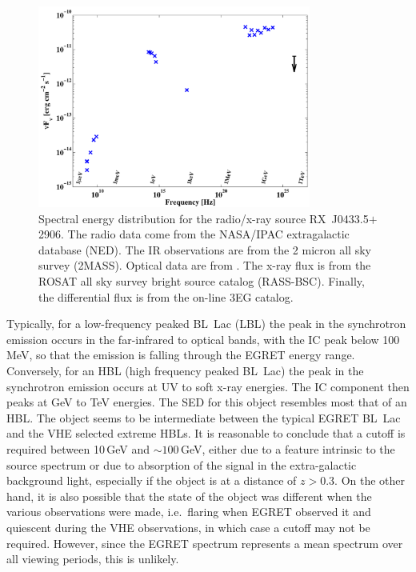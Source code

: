 \begin{figure}[p]
\centerline{\includegraphics[angle=270,width=0.8\textwidth]{plots/chap-observations/sed0433.pdf}}
\caption{\label{FIG::OBSERVATIONS::SED0433} Spectral energy 
distribution for the radio/x-ray source RX~J0433.5$+$2906. The radio data
come from the NASA/IPAC extragalactic database (NED). The IR
observations are from the 2 micron all sky survey (2MASS). Optical
data are from \citet{REF::HALPERN::AJ2003}. The x-ray flux is from the
ROSAT all sky survey bright source catalog (RASS-BSC). Finally, the 
differential \Gray flux is from the on-line 3EG catalog.}
\end{figure}

\enlargethispage{12pt} Typically, for a low-frequency peaked BL~Lac 
(LBL) the peak in the synchrotron emission occurs in the far-infrared
to optical bands, with the IC peak below 100\,MeV, so that the
emission is falling through the EGRET energy range. Conversely, for an
HBL (high frequency peaked BL~Lac) the peak in the synchrotron
emission occurs at UV to soft x-ray energies. The IC component then
peaks at GeV to TeV energies. The SED for this object resembles most
that of an HBL. The object seems to be intermediate between the
typical EGRET BL~Lac and the VHE selected extreme HBLs. It is
reasonable to conclude that a cutoff is required between 10\,GeV and
$\sim100$\,GeV, either due to a feature intrinsic to the source
spectrum or due to absorption of the \Gray signal in the
extra-galactic background light, especially if the object is at a
distance of $z>0.3$. On the other hand, it is also possible that the
state of the object was different when the various observations were
made, i.e.\ flaring when EGRET observed it and quiescent during the
VHE observations, in which case a cutoff may not be required. However,
since the EGRET spectrum represents a mean spectrum over all viewing
periods, this is unlikely.

